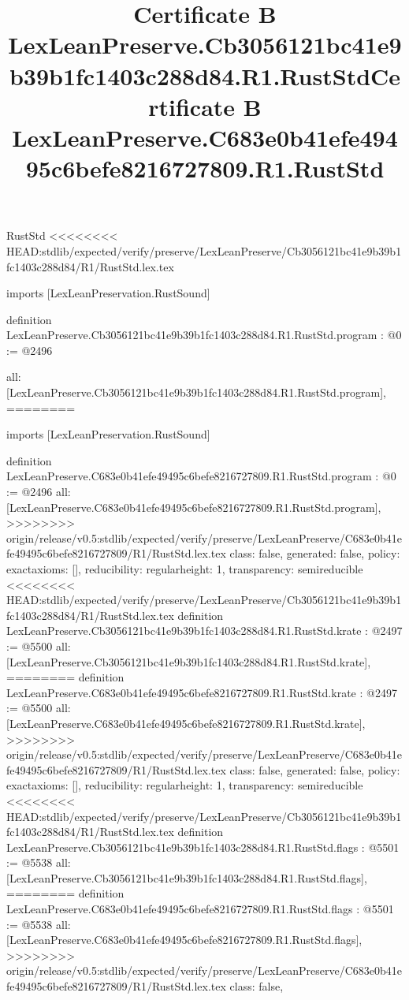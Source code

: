 \begin{lexlean}{RustStd}
<<<<<<<< HEAD:stdlib/expected/verify/preserve/LexLeanPreserve/Cb3056121bc41e9b39b1fc1403c288d84/R1/RustStd.lex.tex
\title{Certificate B LexLeanPreserve.Cb3056121bc41e9b39b1fc1403c288d84.R1.RustStd}
\begin{coremodule}
imports [LexLeanPreservation.RustSound]

definition LexLeanPreserve.Cb3056121bc41e9b39b1fc1403c288d84.R1.RustStd.program : @0 := @2496 {
  all: [LexLeanPreserve.Cb3056121bc41e9b39b1fc1403c288d84.R1.RustStd.program],
========
\title{Certificate B LexLeanPreserve.C683e0b41efe49495c6befe8216727809.R1.RustStd}
\begin{coremodule}
imports [LexLeanPreservation.RustSound]

definition LexLeanPreserve.C683e0b41efe49495c6befe8216727809.R1.RustStd.program : @0 := @2496 {
  all: [LexLeanPreserve.C683e0b41efe49495c6befe8216727809.R1.RustStd.program],
>>>>>>>> origin/release/v0.5:stdlib/expected/verify/preserve/LexLeanPreserve/C683e0b41efe49495c6befe8216727809/R1/RustStd.lex.tex
  class: false,
  generated: false,
  policy: exact{axioms: []},
  reducibility: regular{height: 1},
  transparency: semireducible
}
<<<<<<<< HEAD:stdlib/expected/verify/preserve/LexLeanPreserve/Cb3056121bc41e9b39b1fc1403c288d84/R1/RustStd.lex.tex
definition LexLeanPreserve.Cb3056121bc41e9b39b1fc1403c288d84.R1.RustStd.krate : @2497 := @5500 {
  all: [LexLeanPreserve.Cb3056121bc41e9b39b1fc1403c288d84.R1.RustStd.krate],
========
definition LexLeanPreserve.C683e0b41efe49495c6befe8216727809.R1.RustStd.krate : @2497 := @5500 {
  all: [LexLeanPreserve.C683e0b41efe49495c6befe8216727809.R1.RustStd.krate],
>>>>>>>> origin/release/v0.5:stdlib/expected/verify/preserve/LexLeanPreserve/C683e0b41efe49495c6befe8216727809/R1/RustStd.lex.tex
  class: false,
  generated: false,
  policy: exact{axioms: []},
  reducibility: regular{height: 1},
  transparency: semireducible
}
<<<<<<<< HEAD:stdlib/expected/verify/preserve/LexLeanPreserve/Cb3056121bc41e9b39b1fc1403c288d84/R1/RustStd.lex.tex
definition LexLeanPreserve.Cb3056121bc41e9b39b1fc1403c288d84.R1.RustStd.flags : @5501 := @5538 {
  all: [LexLeanPreserve.Cb3056121bc41e9b39b1fc1403c288d84.R1.RustStd.flags],
========
definition LexLeanPreserve.C683e0b41efe49495c6befe8216727809.R1.RustStd.flags : @5501 := @5538 {
  all: [LexLeanPreserve.C683e0b41efe49495c6befe8216727809.R1.RustStd.flags],
>>>>>>>> origin/release/v0.5:stdlib/expected/verify/preserve/LexLeanPreserve/C683e0b41efe49495c6befe8216727809/R1/RustStd.lex.tex
  class: false,
}}}
\end{coremodule}}
\end{coremodule}
\end{lexlean}
